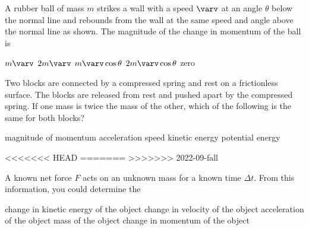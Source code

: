 \documentclass{../../oss-apphys-exam}
\begin{document}
\begin{multicols*}{2}
\begin{questions}
    \question A rubber ball of mass $m$ strikes a wall with a speed $\varv$ at
    an angle $\theta$ below the normal line and rebounds from the wall at the
    same speed and angle above the normal line as shown. The magnitude of the
    change in momentum of the ball is
    \begin{center}
    \end{center}
    \begin{choices}
      \choice $m\varv$
      \choice $2m\varv$
      \choice $m\varv\cos\theta$
      \choice $2m\varv\cos\theta$
      \choice  zero
    \end{choices}
    
    \question Two blocks are connected by a compressed spring and rest on a
    frictionless surface. The blocks are released from rest and pushed apart
    by the compressed spring. If one mass is twice the mass of the other,
    which of the following is the same for both blocks?
    \begin{choices}
      \choice magnitude of momentum
      \choice acceleration
      \choice speed
      \choice kinetic energy
      \choice potential energy
    \end{choices}
<<<<<<< HEAD
=======
    \vspace{.7in}
>>>>>>> 2022-09-fall
    
    \question A known net force $F$ acts on an unknown mass for a known time
    $\Delta t$. From this information, you could determine the
    \begin{choices}
      \choice change in kinetic energy of the object
      \choice change in velocity of the object
      \choice acceleration of the object
      \choice mass of the object
      \choice change in momentum of the object
    \end{choices}
    \columnbreak
    

\end{questions}
\end{multicols*}
\end{document}
